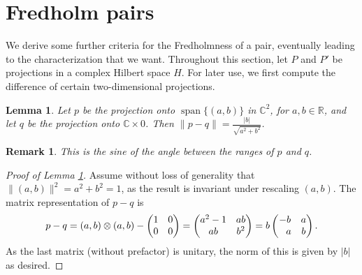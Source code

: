 \documentclass[10pt,a4paper]{amsart}
\numberwithin{equation}{section}
\newtheorem{Lemma}[Theorem]{Lemma}
\newtheorem{Remark}[Theorem]{Remark} }
\DeclareMathOperator{\spann}{span}
\begin{document}
	\section{Fredholm pairs}
	\label{s3}
	We derive some further criteria for the Fredholmness of a pair, eventually leading to the characterization that we want. Throughout this section, let $P$ and $P'$ be projections in a complex Hilbert space $H$. For later use, we first compute the difference of certain two-dimensional projections.
	\begin{Lemma}
		\label{2dE}
		Let $p$ be the projection onto $\spann\{(a,b)\}$ in $\mathbb{C}^2$, for $a,b\in \mathbb{R}$, and let $q$ be the projection onto $\mathbb{C}\times0$. Then $\|p-q\|=\frac{|b|}{\sqrt{a^2+b^2}}$.
	\end{Lemma}
	\begin{Remark}
		This is the sine of the angle between the ranges of $p$ and $q$.
	\end{Remark}
	\begin{proof}[Proof of Lemma \ref{2dE}]
		Assume without loss of generality that $\|(a,b)\|^2=a^2+b^2=1$, as the result is invariant under rescaling $(a,b)$.
		The matrix representation of $p-q$ is
		\[
        p-q=(a,b)\otimes(a,b)-\begin{pmatrix}{1}&{0}\\{0}&{0}\end{pmatrix}
        =\begin{pmatrix}{a^2-1}&{ab}\\{ab}&{b^2}\end{pmatrix}
        =b\begin{pmatrix}{-b}&{a}\\{\hphantom{-} a}&{b}\end{pmatrix}.
        \]
		As the last matrix (without prefactor) is unitary, the norm of this is given by $|b|$ as desired.
	\end{proof}
\end{document}
